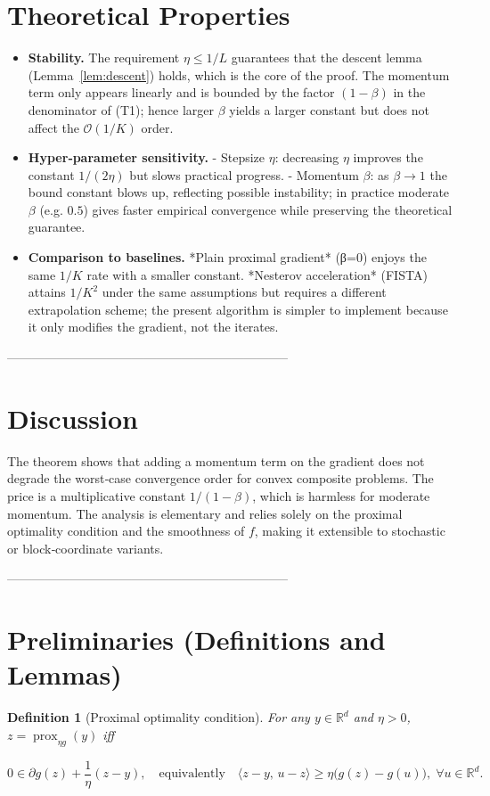 \documentclass{article}
\newtheorem{definition}{Definition}
\newcommand{\prox}{\operatorname{prox}}
\begin{document}
\section*{Theoretical Properties}
\begin{itemize}[leftmargin=*]
\item \textbf{Stability.} The requirement $\eta\le 1/L$ guarantees that the descent
lemma (Lemma~\ref{lem:descent}) holds, which is the core of the proof. The momentum term
only appears linearly and is bounded by the factor $(1-\beta)$ in the denominator of (T1);
hence larger $\beta$ yields a larger constant but does not affect the $\mathcal{O}(1/K)$ order.

\item \textbf{Hyper‑parameter sensitivity.}  
  - Stepsize $\eta$: decreasing $\eta$ improves the constant $1/(2\eta)$ but slows practical progress.  
  - Momentum $\beta$: as $\beta\to 1$ the bound constant blows up, reflecting possible instability; in practice moderate $\beta$ (e.g. $0.5$) gives faster empirical convergence while preserving the theoretical guarantee.

\item \textbf{Comparison to baselines.}  
  *Plain proximal gradient* (β=0) enjoys the same $1/K$ rate with a smaller constant.  
  *Nesterov acceleration* (FISTA) attains $1/K^{2}$ under the same assumptions but requires a different extrapolation scheme; the present algorithm is simpler to implement because it only modifies the gradient, not the iterates.

\end{itemize}

--------------------------------------------------------------------

\section*{Discussion}
The theorem shows that adding a momentum term on the gradient does not degrade the worst‑case convergence order for convex composite problems. The price is a multiplicative constant $1/(1-\beta)$, which is harmless for moderate momentum. The analysis is elementary and relies solely on the proximal optimality condition and the smoothness of $f$, making it extensible to stochastic or block‑coordinate variants.

--------------------------------------------------------------------

\section*{Preliminaries (Definitions and Lemmas)}
\begin{definition}[Proximal optimality condition]\label{def:prox-opt}
For any $y\in\mathbb{R}^d$ and $\eta>0$, $z=\prox_{\eta g}(y)$ iff  

\[
0\in \partial g(z)+\frac{1}{\eta}(z-y),
\quad\text{equivalently}\quad
\langle z-y,\,u-z\rangle\ge \eta\bigl(g(z)-g(u)\bigr),\;\forall u\in\mathbb{R}^d .
\tag{P1}
\]
\end{definition}
\end{document}
